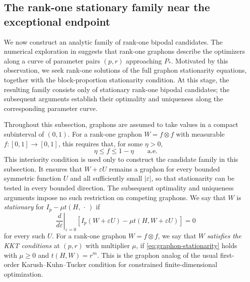 \subsection{The rank-one stationary family near the exceptional endpoint}
\label{sec:rank-one-stationary-family}

We now construct an analytic family of rank-one bipodal
candidates.  The numerical exploration in 
suggests that rank-one graphons describe the optimizers along a curve of
parameter pairs $(p,r)$ approaching $P_*$.  Motivated by this observation,
we seek rank-one solutions of the full graphon stationarity equations,
together with the block-proportion stationarity condition.
At this stage, the resulting family consists only of stationary
rank-one bipodal candidates; the subsequent arguments establish their optimality and
uniqueness along the corresponding parameter curve.

Throughout this subsection, graphons are assumed to take values in a compact
subinterval of $(0,1)$.  For a rank-one graphon $W=f\otimes f$ with
measurable $f:[0,1]\to[0,1]$, this requires that, for some $\eta>0$,
\[
  \eta\le f\le1-\eta
  \qquad\text{a.e.}
\]
This interiority condition is used only to construct the candidate family in
this subsection.  It ensures that $W+\varepsilon U$ remains a graphon for every
bounded symmetric function $U$ and all sufficiently small $|\varepsilon|$, so
that stationarity can be tested in every bounded direction.  The subsequent
optimality and uniqueness arguments impose no such restriction on competing
graphons.  We say that $W$ is \emph{stationary} for
$I_p-\mu t(H,\,\cdot\,)$ if
\begin{equation}\label{eq:graphon-stationarity}
  \left.\frac{d}{d\varepsilon}\right|_{\varepsilon=0}
  \left[
    I_p(W+\varepsilon U)
    -\mu t(H,W+\varepsilon U)
  \right]=0
\end{equation}
for every such $U$.
For a rank-one graphon $W=f\otimes f$, we say that $W$ \emph{satisfies the
KKT conditions} at $(p,r)$ with multiplier $\mu$, if \eqref{eq:graphon-stationarity}
holds with $\mu\ge0$ and $t(H,W)=r^m$.  This is the graphon
analog of the usual first-order Karush--Kuhn--Tucker condition for
constrained finite-dimensional optimization.


